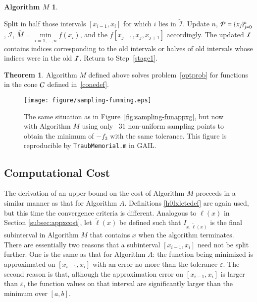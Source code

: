 \documentclass[review]{elsarticle}
\newcommand{\abstol}{\varepsilon}
\theoremstyle{definition}
\newtheorem*{algoM}{Algorithm $M$}
\newcommand{\scnote}[1]{ {\textcolor{orange}  {\mbox{**SC:} #1}}}
\newcommand{\tell}{\tilde{\ell}}
\newcommand{\hM}{\widehat{M}}
\newtheorem{theorem}{Theorem}
\newcommand{\minfi}{\min\limits_{i=1, \ldots,  n} f(x_i)} %
\begin{document}
\begin{algoM}
\begin{enumerate}[\em Step 1.]
		Split in half those intervals $[x_{i-1},x_i]$ for which $i$ lies in $\widetilde{\mathcal{I}}$.
		Update $n$, $\mathcal{P} = \{x_j\}_{j=0}^n$, $\mathcal{I}$, $\hM = \minfi$, and the $f[x_{j-1}, x_{j}, x_{j+1}]$ accordingly.  The updated $\mathcal{I}$ contains  indices corresponding to the old intervals or halves of old intervals whose indices were in the old $\mathcal{I}$.  Return to Step~\ref{stage1}.
	\end{enumerate}
\end{algoM}

\begin{theorem} \label{thm:algMworks}
Algorithm $M$ defined above solves problem~\eqref{optprob} for functions in the cone $\mathcal{C}$ defined in~\eqref{conedef}.
\end{theorem}

\begin{figure}[tbh]
\centering
\texttt{[image: figure/sampling-funming.eps]}
\caption{The same situation as in Figure~\ref{fig:sampling-funappxg}, but now with Algorithm $M$ using only ~$31$ non-uniform sampling points to obtain the minimum of $-f_3$ with the same
tolerance. This figure is reproducible by {\tt TraubMemorial.m} in GAIL.}
\label{fig:sampling-funming}
\end{figure}

\subsection{Computational Cost} \label{subsec:optcost}
The derivation of an upper bound on the cost of Algorithm $M$ proceeds in a similar manner as that for Algorithm $A$.  Definitions \eqref{h0Ixletcdef} are again used, but this time the convergence criteria is different.  Analogous to $\ell(x)$ in Section \ref{subsec:appxcost}, let $\tell(x)$ be defined such that $I_{x,\tell(x)}$ is the final subinterval in Algorithm $M$ that contains $x$ when the algorithm terminates. There are essentially two reasons that a subinterval $[x_{i-1},x_i]$ need not be split further.  One is the same as that for Algorithm $A$:  the function being minimized is approximated on $[x_{i-1},x_i]$ with an error no more than the tolerance $\abstol$.  The second reason is that, although the approximation error on $[x_{i-1},x_i]$ is larger than $\abstol$, the function values on that interval are significantly larger than the minimum over $[a,b]$.
\end{document}
